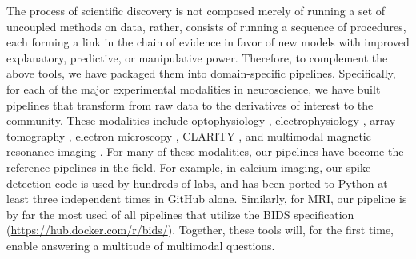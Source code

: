 \documentclass[11pt]{article}
\renewcommand{\para}[1]{\vspace{-10pt}\fontsize{10pt}{0pt}\paragraph{#1}}
\begin{document}

%
The process of scientific discovery is not composed merely of running a set of uncoupled methods on data, rather, consists of running a sequence of procedures, each forming a link in the chain of evidence in favor of new models with improved explanatory, predictive, or manipulative power.  Therefore, to complement the above tools, we have packaged them into domain-specific pipelines.
Specifically, for each of the major experimental modalities in neuroscience, we have built pipelines that transform from raw data to the derivatives of interest to the community.  These modalities include optophysiology \cite{Vogelstein2009c, Vogelstein2010b, Yuste2011c},  electrophysiology \cite{Paninski2010, Carlson2013b, Carlson2013c}, array tomography \cite{weiler2014synaptic}, electron microscopy \cite{roncal2014vesicle,roncal2015automated,kasthuri2015saturated}, CLARITY \cite{kutten2016deformably,kutten2016diffeomorphic}, and multimodal magnetic resonance imaging \cite{gray2011magnetic, roncal2013migraine, mhembere2013computing}.
For many of these modalities, our pipelines have become the reference pipelines in the field.  For example, in calcium imaging, our spike detection code is used by hundreds of labs, and has been ported to Python at least three independent times in GitHub alone.  Similarly, for MRI, our pipeline is by far the most used of all pipelines that utilize the BIDS specification (\url{https://hub.docker.com/r/bids/}).  
Together, these tools will, for the first time, enable answering a multitude of multimodal questions.





%


\end{document}

